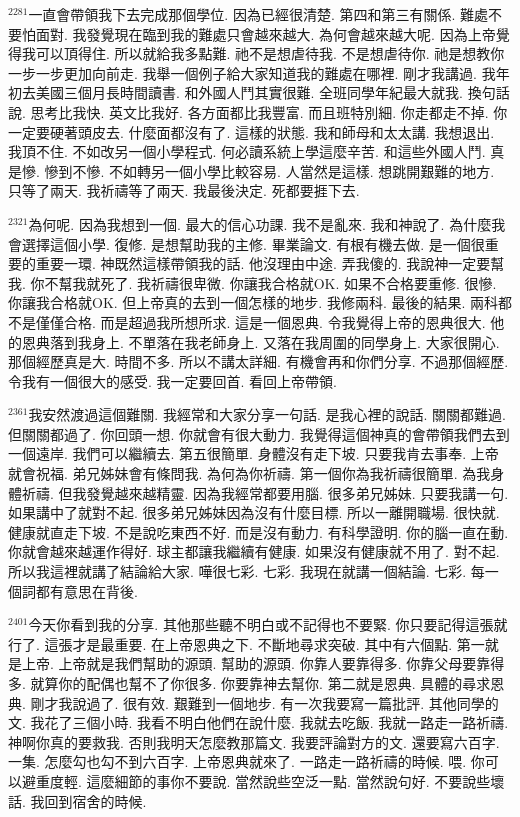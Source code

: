 \documentclass{book}
\begin{document}
$^{2281}$一直會帶領我下去完成那個學位.
因為已經很清楚.
第四和第三有關係.
難處不要怕面對.
我發覺現在臨到我的難處只會越來越大.
為何會越來越大呢.
因為上帝覺得我可以頂得住.
所以就給我多點難.
祂不是想虐待我.
不是想虐待你.
祂是想教你一步一步更加向前走.
我舉一個例子給大家知道我的難處在哪裡.
剛才我講過.
我年初去美國三個月長時間讀書.
和外國人鬥其實很難.
全班同學年紀最大就我.
換句話說.
思考比我快.
英文比我好.
各方面都比我豐富.
而且班特別細.
你走都走不掉.
你一定要硬著頭皮去.
什麼面都沒有了.
這樣的狀態.
我和師母和太太講.
我想退出.
我頂不住.
不如改另一個小學程式.
何必讀系統上學這麼辛苦.
和這些外國人鬥.
真是慘.
慘到不慘.
不如轉另一個小學比較容易.
人當然是這樣.
想跳開艱難的地方.
只等了兩天.
我祈禱等了兩天.
我最後決定.
死都要捱下去.

$^{2321}$為何呢.
因為我想到一個.
最大的信心功課.
我不是亂來.
我和神說了.
為什麼我會選擇這個小學.
復修.
是想幫助我的主修.
畢業論文.
有根有機去做.
是一個很重要的重要一環.
神既然這樣帶領我的話.
他沒理由中途.
弄我傻的.
我說神一定要幫我.
你不幫我就死了.
我祈禱很卑微.
你讓我合格就OK.
如果不合格要重修.
很慘.
你讓我合格就OK.
但上帝真的去到一個怎樣的地步.
我修兩科.
最後的結果.
兩科都不是僅僅合格.
而是超過我所想所求.
這是一個恩典.
令我覺得上帝的恩典很大.
他的恩典落到我身上.
不單落在我老師身上.
又落在我周圍的同學身上.
大家很開心.
那個經歷真是大.
時間不多.
所以不講太詳細.
有機會再和你們分享.
不過那個經歷.
令我有一個很大的感受.
我一定要回首.
看回上帝帶領.

$^{2361}$我安然渡過這個難關.
我經常和大家分享一句話.
是我心裡的說話.
關關都難過.
但關關都過了.
你回頭一想.
你就會有很大動力.
我覺得這個神真的會帶領我們去到一個遠岸.
我們可以繼續去.
第五很簡單.
身體沒有走下坡.
只要我肯去事奉.
上帝就會祝福.
弟兄姊妹會有條問我.
為何為你祈禱.
第一個你為我祈禱很簡單.
為我身體祈禱.
但我發覺越來越精靈.
因為我經常都要用腦.
很多弟兄姊妹.
只要我講一句.
如果講中了就對不起.
很多弟兄姊妹因為沒有什麼目標.
所以一離開職場.
很快就.
健康就直走下坡.
不是說吃東西不好.
而是沒有動力.
有科學證明.
你的腦一直在動.
你就會越來越運作得好.
球主都讓我繼續有健康.
如果沒有健康就不用了.
對不起.
所以我這裡就講了結論給大家.
嘩很七彩.
七彩.
我現在就講一個結論.
七彩.
每一個詞都有意思在背後.

$^{2401}$今天你看到我的分享.
其他那些聽不明白或不記得也不要緊.
你只要記得這張就行了.
這張才是最重要.
在上帝恩典之下.
不斷地尋求突破.
其中有六個點.
第一就是上帝.
上帝就是我們幫助的源頭.
幫助的源頭.
你靠人要靠得多.
你靠父母要靠得多.
就算你的配偶也幫不了你很多.
你要靠神去幫你.
第二就是恩典.
具體的尋求恩典.
剛才我說過了.
很有效.
艱難到一個地步.
有一次我要寫一篇批評.
其他同學的文.
我花了三個小時.
我看不明白他們在說什麼.
我就去吃飯.
我就一路走一路祈禱.
神啊你真的要救我.
否則我明天怎麼教那篇文.
我要評論對方的文.
還要寫六百字.
一集.
怎麼勾也勾不到六百字.
上帝恩典就來了.
一路走一路祈禱的時候.
喂.
你可以避重度輕.
這麼細節的事你不要說.
當然說些空泛一點.
當然說句好.
不要說些壞話.
我回到宿舍的時候.
\end{document}
